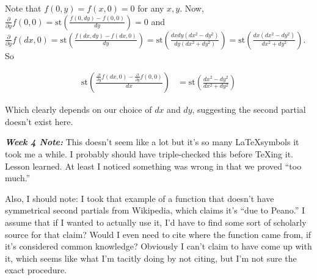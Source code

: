 \documentclass{article}
\newcommand{\st}[1]{\mathrm{st}#1}
\newcommand{\del}{\partial}
\begin{document}
    Note that $f(0, y) = f(x, 0) = 0$ for any $x, y$. Now, $\frac{\del}{\del y} f(0, 0) = \st{\left(\frac{f(0, dy) - f(0, 0)}{dy}\right)} = 0$ and $\frac{\del}{\del y} f(dx, 0) = \st{\left(\frac{f(dx, dy) - f(dx, 0)}{dy}\right)} = \st{\left(\frac{dxdy(dx^2-dy^2)}{dy(dx^2+dy^2)}\right)}=\st{\left(\frac{dx(dx^2-dy^2)}{dx^2+dy^2}\right)}$. So
    
    \begin{align*}
    \st{\left( \frac{\frac{\del}{\del y} f(dx, 0) - \frac{\del}{\del y} f(0, 0)}{dx} \right)} &= \st{\left(\frac{dx^2-dy^2}{dx^2+dy^2}\right)}
    \end{align*}
    
    Which clearly depends on our choice of $dx$ and $dy$, suggesting the second partial doesn't exist here.

    \textbf{\textit{Week 4 Note:}} This doesn't seem like a lot but it's so many \LaTeX symbols it took me a while. I probably should have triple-checked this before TeXing it. Lesson learned. At least I noticed something was wrong in that we proved ``too much.''

    Also, I should note: I took that example of a function that doesn't have symmetrical second partials from Wikipedia, which claims it's ``due to Peano.'' I assume that if I wanted to actually use it, I'd have to find some sort of scholarly source for that claim? Would I even need to cite where the function came from, if it's considered common knowledge? Obviously I can't claim to have come up with it, which seems like what I'm tacitly doing by not citing, but I'm not sure the exact procedure.
\end{document}
